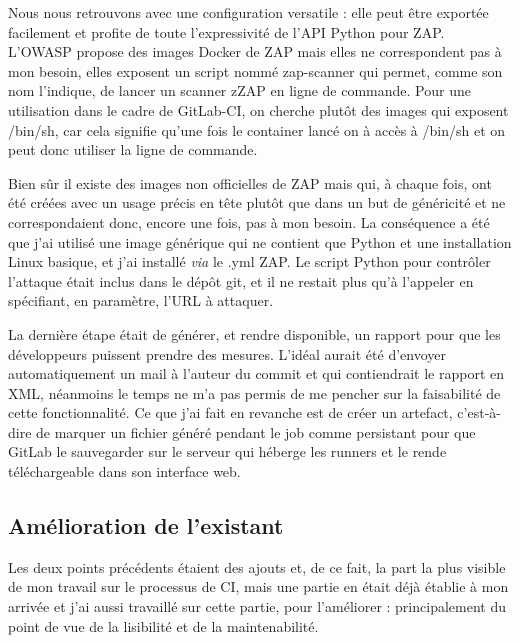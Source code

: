 Nous nous retrouvons avec une configuration versatile : elle peut être exportée facilement et profite de toute l'expressivité de l'API Python pour ZAP. L'OWASP propose des images Docker de ZAP
mais elles ne correspondent pas à mon besoin, elles exposent un script nommé zap-scanner qui permet, comme son nom l'indique, de lancer un scanner zZAP en ligne de commande. Pour une utilisation dans le cadre de GitLab-CI, on cherche plutôt des images qui exposent /bin/sh, car cela signifie qu'une fois le container lancé on à accès à /bin/sh et on peut donc utiliser la ligne de commande.

Bien sûr il existe des images non officielles de ZAP
mais qui, à chaque fois, ont été créées avec un usage précis en tête plutôt que dans un but de généricité et ne correspondaient donc, encore une fois, pas à mon besoin. La conséquence a été que j'ai utilisé une image générique
qui ne contient que Python et une installation Linux basique, et j'ai installé \textit{via} le .yml ZAP. Le script Python pour contrôler l'attaque était inclus dans le dépôt git, et il ne restait plus qu'à l'appeler en spécifiant, en paramètre, l'URL à attaquer. 

La dernière étape était de générer, et rendre disponible, un rapport pour que les développeurs puissent prendre des mesures. L'idéal aurait été d'envoyer automatiquement un mail à l'auteur du commit et qui contiendrait le rapport en XML, néanmoins le temps ne m'a pas permis de me pencher sur la faisabilité de cette fonctionnalité. Ce que j'ai  fait en revanche est de créer un artefact, c'est-à-dire de marquer un fichier généré pendant le job comme persistant pour que GitLab le sauvegarder sur le serveur qui héberge les runners et le rende téléchargeable dans son interface web.

\subsection{Amélioration de l'existant}
Les deux points précédents étaient des ajouts et, de ce fait, la part la plus visible de mon travail sur le processus de CI, mais une partie en était déjà établie à mon arrivée et j'ai aussi travaillé sur cette partie, pour l'améliorer : principalement du point de vue de la lisibilité et de la maintenabilité.

